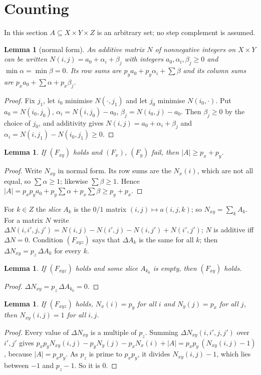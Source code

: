 \documentclass[11pt,a4paper]{amsart}
\newtheorem{lemma}[theorem]{Lemma}
\theoremstyle{definition}
\theoremstyle{remark}
\begin{document}
\section{Counting}\label{N:sec:count}

In this section $A\subseteq X\times Y\times Z$ is an arbitrary set; no step complement is assumed.

\begin{lemma}[normal form]\label{N:lem:nf}
An additive matrix $N$ of nonnegative integers on $X\times Y$ can be written $N(i,j)=a_0+\alpha_i+\beta_j$ with
integers $a_0,\alpha_i,\beta_j\ge 0$ and $\min\alpha=\min\beta=0$. Its row sums are
$p_ya_0+p_y\alpha_i+\sum\beta$ and its column sums are $p_xa_0+\sum\alpha+p_x\beta_j$.
\end{lemma}
\begin{proof}
Fix $j_1$, let $i_0$ minimise $N(\cdot,j_1)$ and let $j_0$ minimise $N(i_0,\cdot)$. Put $a_0=N(i_0,j_0)$,
$\alpha_i=N(i,j_0)-a_0$, $\beta_j=N(i_0,j)-a_0$. Then $\beta_j\ge 0$ by the choice of $j_0$, and additivity gives
$N(i,j)=a_0+\alpha_i+\beta_j$ and $\alpha_i=N(i,j_1)-N(i_0,j_1)\ge 0$.
\end{proof}

\begin{lemma}\label{N:lem:three}
If $(F_{xy})$ holds and $(F_x)$, $(F_y)$ fail, then $|A|\ge p_x+p_y$.
\end{lemma}
\begin{proof}
Write $N_{xy}$ in normal form. Its row sums are the $N_x(i)$, which are not all equal, so $\sum\alpha\ge 1$;
likewise $\sum\beta\ge1$. Hence $|A|=p_xp_ya_0+p_y\sum\alpha+p_x\sum\beta\ge p_y+p_x$.
\end{proof}

For $k\in Z$ the \emph{slice} $A_k$ is the $0/1$ matrix $(i,j)\mapsto a(i,j,k)$; so $N_{xy}=\sum_kA_k$. For a
matrix $N$ write $\Delta N(i,i',j,j')=N(i,j)-N(i',j)-N(i,j')+N(i',j')$; $N$ is additive iff $\Delta N=0$.
Condition $(F_{xyz})$ says that $\Delta A_k$ is the same for all $k$; then $\Delta N_{xy}=p_z\,\Delta A_k$ for
every $k$.

\begin{lemma}\label{N:lem:four}
If $(F_{xyz})$ holds and some slice $A_{k_0}$ is empty, then $(F_{xy})$ holds.
\end{lemma}
\begin{proof}
$\Delta N_{xy}=p_z\,\Delta A_{k_0}=0$.
\end{proof}

\begin{lemma}\label{N:lem:five}
If $(F_{xyz})$ holds, $N_x(i)=p_y$ for all $i$ and $N_y(j)=p_x$ for all $j$, then $N_{xy}(i,j)=1$ for all $i,j$.
\end{lemma}
\begin{proof}
Every value of $\Delta N_{xy}$ is a multiple of $p_z$. Summing $\Delta N_{xy}(i,i',j,j')$ over $i',j'$ gives
$p_xp_yN_{xy}(i,j)-p_yN_y(j)-p_xN_x(i)+|A|=p_xp_y\,(N_{xy}(i,j)-1)$, because $|A|=p_xp_y$. As $p_z$ is prime to
$p_xp_y$, it divides $N_{xy}(i,j)-1$, which lies between $-1$ and $p_z-1$. So it is $0$.
\end{proof}
\end{document}
